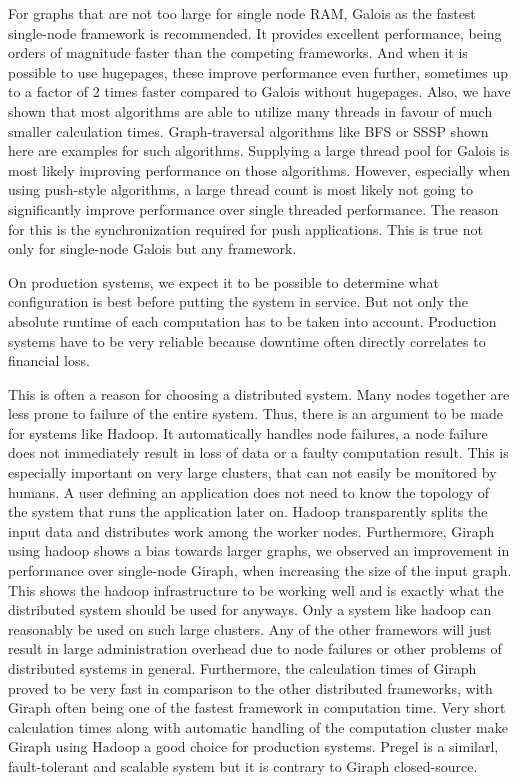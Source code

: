 For graphs that are not too large for single node RAM, Galois as the fastest single-node framework is recommended.
It provides excellent performance, being orders of magnitude faster than the competing frameworks. And when it is possible to use hugepages, these improve performance even further, sometimes up to a factor of 2 times faster compared to Galois without hugepages.
Also, we have shown that most algorithms are able to utilize many threads in favour of much smaller calculation times. Graph-traversal algorithms like BFS or SSSP shown here are examples for such algorithms.
Supplying a large thread pool for Galois is most likely improving performance on those algorithms.
However, especially when using push-style algorithms, a large thread count is most likely not going to significantly improve performance over single threaded performance. The reason for this is the synchronization required for push applications. This is true not only for single-node Galois but any framework.



On production systems, we expect it to be possible to determine what configuration is best before putting the system in service.
But not only the absolute runtime of each computation has to be taken into account. Production systems have to be very reliable because downtime often directly correlates to financial loss.

This is often a reason for choosing a distributed system. Many nodes together are less prone to failure of the entire system.
Thus, there is an argument to be made for systems like Hadoop.
It automatically handles node failures, a node failure does not immediately result in loss of data or a faulty computation result.
This is especially important on very large clusters, that can not easily be monitored by humans.
A user defining an application does not need to know the topology of the system that runs the application later on.
Hadoop transparently splits the input data and distributes work among the worker nodes.
Furthermore, Giraph using hadoop shows a bias towards larger graphs, we observed an improvement in performance over single-node Giraph, when increasing the size of the input graph.
This shows the hadoop infrastructure to be working well and is exactly what the distributed system should be used for anyways. 
Only a system like hadoop can reasonably be used on such large clusters.
Any of the other framewors will just result in large administration overhead due to node failures or other problems of distributed systems in general.
Furthermore, the calculation times of Giraph proved to be very fast in comparison to the other distributed frameworks, with Giraph often being one of the fastest framework in computation time.
Very short calculation times along with automatic handling of the computation cluster make Giraph using Hadoop a good choice for production systems.
Pregel is a similarl, fault-tolerant and scalable system but it is contrary to Giraph closed-source.

